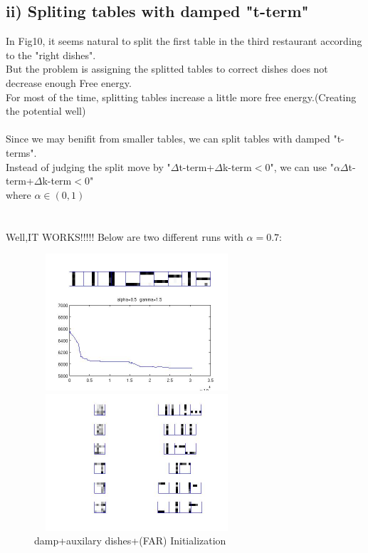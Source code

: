 \documentclass{article}
\begin{document}
\begin{spacing}{1.1}
\subsection{ii) Spliting tables with damped "t-term"}
In Fig10, it seems natural to split the first table in the third restaurant according to the "right dishes".\\
But the problem is assigning the splitted tables to correct dishes does not decrease enough Free energy.\\
For most of the time, splitting tables increase a little more free energy.(Creating the potential well)\\ \\
Since we may benifit from smaller tables, we can split tables with damped "t-terms".\\
Instead of judging the split move by "$\Delta$t-term+$\Delta$k-term$<$0", we can use "$\alpha \Delta$t-term+$\Delta$k-term$<$0"\\
where $\alpha \in (0,1)$\\ \\ \\
Well,IT WORKS!!!!! Below are two different runs with $\alpha=0.7$:
\begin{figure}[h] 
  \begin{minipage}[b]{0.5\textwidth} 
    \centering 
    \includegraphics[width=3in,height=2in]{shape_damped_split.jpg} 
    \caption{damp+auxilary dishes+(FAR) Initialization}
    \label{fig:by:table} 
  \end{minipage}%
  \begin{minipage}[b]{0.5\textwidth} 
    \centering 
    \includegraphics[width=3in,height=2in]{shape_damp_end.jpg} 

\end{minipage}
\end{figure}
\end{spacing}
\end{document}
